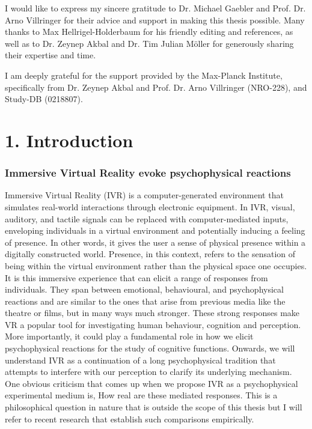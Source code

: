 \documentclass[12pt,oneside,openright]{report}
\begin{document}
\begin{adjustwidth}{1cm}{1cm}

I would like to express my sincere gratitude to Dr. Michael Gaebler and Prof. Dr. Arno Villringer for their advice and support in making this thesis possible. Many thanks to Max Hellrigel-Holderbaum for his friendly editing and references, as well as to Dr. Zeynep Akbal and Dr. Tim Julian Möller for generously sharing their expertise and time.

I am deeply grateful for the support provided by the Max-Planck Institute, specifically from Dr. Zeynep Akbal and Prof. Dr. Arno Villringer (NRO-228), and Study-DB (0218807).
    
\end{adjustwidth}

\clearpage

\section*{1. Introduction}

\subsubsection*{Immersive Virtual Reality evoke psychophysical reactions}

Immersive Virtual Reality (IVR) is a computer-generated environment that simulates real-world interactions through electronic equipment. In IVR, visual, auditory, and tactile signals can be replaced with computer-mediated inputs, enveloping individuals in a virtual environment and potentially inducing a feeling of presence. In other words, it gives the user a sense of physical presence within a digitally constructed world. Presence, in this context, refers to the sensation of being within the virtual environment rather than the physical space one occupies. It is this immersive experience that can elicit a range of responses from individuals. They span between emotional, behavioural, and psychophysical reactions \parencite{SanchezVives2005FromPT} and are similar to the ones that arise from previous media like the theatre or films, but in many ways much stronger. These strong responses make VR a popular tool for investigating human behaviour, cognition and perception. More importantly, it could play a fundamental role in how we elicit psychophysical reactions for the study of cognitive functions. Onwards, we will understand IVR as a continuation of a long psychophysical tradition that attempts to interfere with our perception to clarify its underlying mechanism. One obvious criticism that comes up when we propose IVR as a psychophysical experimental medium is, How real are these mediated responses. This is a philosophical question in nature that is outside the scope of this thesis but I will refer to recent research that establish such comparisons empirically. 
\end{document}
